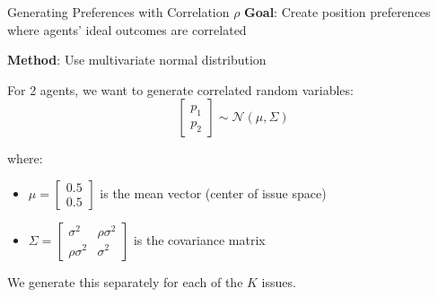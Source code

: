 \documentclass{beamer}
\begin{document}
\begin{frame}{Generating Preferences with Correlation $\rho$}
\textbf{Goal}: Create position preferences where agents' ideal outcomes are correlated

\vspace{0.3cm}

\textbf{Method}: Use multivariate normal distribution

For 2 agents, we want to generate correlated random variables:
\begin{equation*}
\begin{bmatrix} p_1 \\ p_2 \end{bmatrix} \sim \mathcal{N}\left(\mu, \Sigma\right)
\end{equation*}

where:
\begin{itemize}
    \item $\mu = \begin{bmatrix} 0.5 \\ 0.5 \end{bmatrix}$ is the mean vector (center of issue space)
    \item $\Sigma = \begin{bmatrix} \sigma^2 & \rho\sigma^2 \\ \rho\sigma^2 & \sigma^2 \end{bmatrix}$ is the covariance matrix
\end{itemize}

\vspace{0.3cm}

We generate this separately for each of the $K$ issues.
\end{frame}
\end{document}
